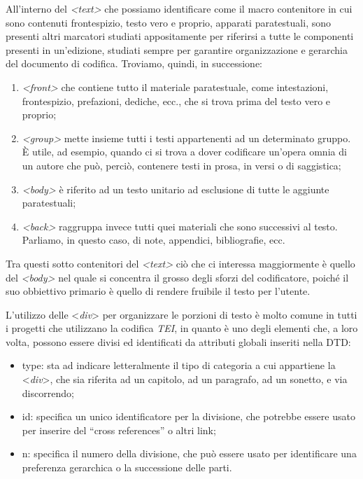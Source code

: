 \documentclass[
  b5paper,
  twoside,
  12pt,
  chapterprefix=false,
  bibliography=totocnumbered,
  parskip=false]{scrbook}
\begin{document}
All'interno del \emph{\textless text\textgreater{}} che possiamo identificare come il macro
contenitore in cui sono contenuti frontespizio, testo vero e proprio,
apparati paratestuali, sono presenti altri marcatori studiati
appositamente per riferirsi a tutte le componenti presenti in
un'edizione, studiati sempre per garantire organizzazione e gerarchia
del documento di codifica. Troviamo, quindi, in successione:

\begin{enumerate}
\def\labelenumi{\arabic{enumi}.}
\item
  \emph{\textless front\textgreater{}} che contiene tutto il materiale paratestuale, come
  intestazioni, frontespizio, prefazioni, dediche, ecc., che si trova
  prima del testo vero e proprio;
\item
  \emph{\textless group\textgreater{}} mette insieme tutti i testi appartenenti ad un
  determinato gruppo. È utile, ad esempio, quando ci si trova a dover
  codificare un'opera omnia di un autore che può, perciò, contenere
  testi in prosa, in versi o di saggistica;
\item
  \emph{\textless body\textgreater{}} è riferito ad un testo unitario ad esclusione di tutte le
  aggiunte paratestuali;
\item
  \emph{\textless back\textgreater{}} raggruppa invece tutti quei materiali che sono successivi
  al testo. Parliamo, in questo caso, di note, appendici,
  bibliografie, ecc.
\end{enumerate}

Tra questi sotto contenitori del \emph{\textless text\textgreater{}} ciò che ci interessa
maggiormente è quello del \emph{\textless body\textgreater{}} nel quale si concentra il grosso
degli sforzi del codificatore, poiché il suo obbiettivo primario è
quello di rendere fruibile il testo per l'utente.

L'utilizzo delle \textless{}\emph{div}\textgreater{} per organizzare le porzioni di testo è molto
comune in tutti i progetti che utilizzano la codifica \emph{TEI}, in quanto è
uno degli elementi che, a loro volta, possono essere divisi ed
identificati da attributi globali inseriti nella DTD:

\begin{itemize}
\item
  type: sta ad indicare letteralmente il tipo di categoria a cui
  appartiene la \textless{}\emph{div}\textgreater, che sia riferita ad un capitolo, ad un
  paragrafo, ad un sonetto, e via discorrendo;
\item
  id: specifica un unico identificatore per la divisione, che potrebbe
  essere usato per inserire del \enquote{cross references} o altri link;
\item
  n: specifica il numero della divisione, che può essere usato per
  identificare una preferenza gerarchica o la successione delle parti.
\end{itemize}
\end{document}
